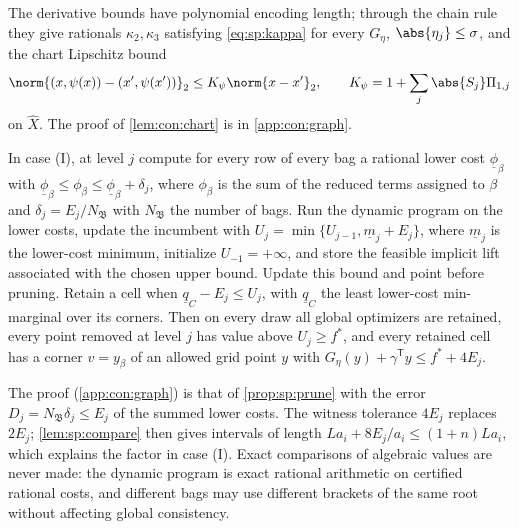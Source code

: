 The derivative bounds have polynomial encoding length; through the chain
rule they give rationals $\kappa_2,\kappa_3$ satisfying \eqref{eq:sp:kappa}
for every $G_\eta$, $\abs{\eta_j}\le\sigma$, and the chart Lipschitz bound
\begin{equation}\label{eq:con:Kpsi}
 \norm{(x,\psi(x))-(x',\psi(x'))}_2\le K_\psi\norm{x-x'}_2,
 \qquad K_\psi=1+\sum_j\abs{S_j}\Pi_{1,j}
\end{equation}
on $\widehat X$. The proof of \cref{lem:con:chart} is in \cref{app:con:graph}.

\begin{lemma}\label{lem:con:approx}
In case (I), at level $j$ compute for every row of every bag a rational lower
cost $\underline\phi_\beta$ with
$\underline\phi_\beta\le\phi_\beta\le\underline\phi_\beta+\delta_j$, where
$\phi_\beta$ is the sum of the reduced terms assigned to $\beta$ and
$\delta_j=E_j/N_{\mathfrak B}$ with $N_{\mathfrak B}$ the number of bags. Run
the dynamic program on the lower costs, update the incumbent with
$U_j=\min\{U_{j-1},\underline m_j+E_j\}$, where $\underline m_j$ is the
lower-cost minimum, initialize $U_{-1}=+\infty$, and store the feasible
implicit lift associated with the chosen upper bound. Update this bound
and point before pruning. Retain a cell when $\underline q_C-E_j\le U_j$, with
$\underline q_C$ the least lower-cost min-marginal over its corners. Then on
every draw all global optimizers are retained, every point removed at level
$j$ has value above $U_j\ge f^*$, and every retained cell has a corner
$v=y_\beta$ of an allowed grid point $y$ with
$G_\eta(y)+\gamma^{\mathsf T}y\le f^*+4E_j$.
\end{lemma}

The proof (\cref{app:con:graph}) is that of \cref{prop:sp:prune} with the
error $D_j=N_{\mathfrak B}\delta_j\le E_j$ of the summed lower costs. The
witness tolerance $4E_j$ replaces $2E_j$; \cref{lem:sp:compare} then gives
intervals of length $La_i+8E_j/a_i\le(1+n)La_i$, which explains the factor in
case (I). Exact comparisons of algebraic values are never made: the dynamic
program is exact rational arithmetic on certified rational costs, and
different bags may use different brackets of the same root without affecting
global consistency.

